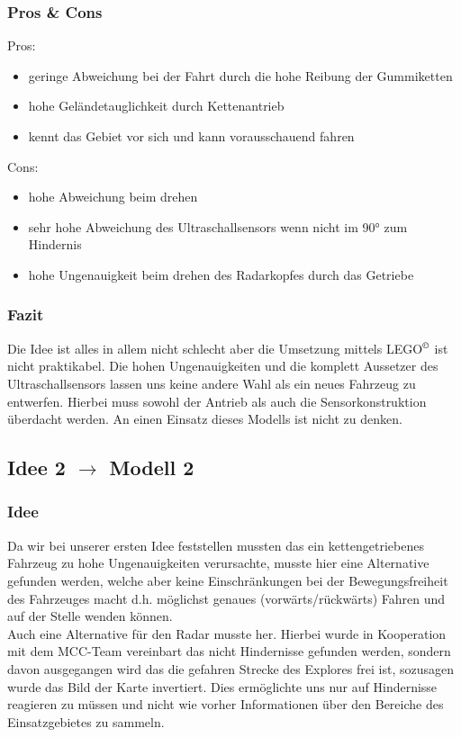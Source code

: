 \documentclass[10pt,a4paper]{scrartcl}
\begin{document}
\subsubsection{Pros \& Cons}
Pros:
\begin{itemize}
\item geringe Abweichung bei der Fahrt durch die hohe Reibung der Gummiketten
\item hohe Geländetauglichkeit durch Kettenantrieb
\item kennt das Gebiet vor sich und kann vorausschauend fahren
\end{itemize}
Cons:
\begin{itemize}
\item hohe Abweichung beim drehen
\item sehr hohe Abweichung des Ultraschallsensors wenn nicht im 90° zum Hindernis
\item hohe Ungenauigkeit beim drehen des Radarkopfes durch das Getriebe
\end{itemize}
\subsubsection{Fazit}
Die Idee ist alles in allem nicht schlecht aber die Umsetzung mittels LEGO$^\copyright$ ist nicht praktikabel. Die hohen Ungenauigkeiten und die komplett Aussetzer des Ultraschallsensors lassen uns keine andere Wahl als ein neues Fahrzeug zu entwerfen. Hierbei muss sowohl der Antrieb als auch die Sensorkonstruktion überdacht werden. An einen Einsatz dieses Modells ist nicht zu denken.
\subsection{Idee 2 $\rightarrow$ Modell 2}%
\subsubsection{Idee}
Da wir bei unserer ersten Idee feststellen mussten das ein kettengetriebenes Fahrzeug zu hohe Ungenauigkeiten verursachte, musste hier eine Alternative gefunden werden, welche aber keine Einschränkungen bei der Bewegungsfreiheit des Fahrzeuges macht d.h. möglichst genaues (vorwärts/rückwärts) Fahren und auf der Stelle wenden können.\\
Auch eine Alternative für den Radar musste her. Hierbei wurde in Kooperation mit dem MCC-Team vereinbart das nicht Hindernisse gefunden werden, sondern davon ausgegangen wird das die gefahren Strecke des Explores frei ist, sozusagen wurde das Bild der Karte invertiert. Dies ermöglichte uns nur auf Hindernisse reagieren zu müssen und nicht wie vorher Informationen über den Bereiche des Einsatzgebietes zu sammeln.
\end{document}
